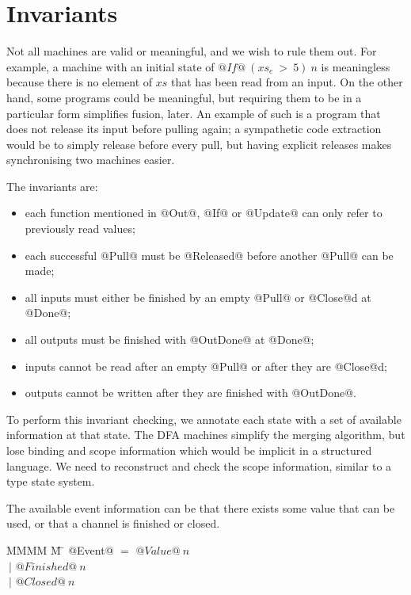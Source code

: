 \section{Invariants}
\label{s:Machines:Invariants}
Not all machines are valid or meaningful, and we wish to rule them out.
For example, a machine with an initial state of $@If@~(xs_e~>~5)~n$ is meaningless because there is no element of $xs$ that has been read from an input. 
On the other hand, some programs could be meaningful, but requiring them to be in a particular form simplifies fusion, later.
An example of such is a program that does not release its input before pulling again; a sympathetic code extraction would be to simply release before every pull, but having explicit releases makes synchronising two machines easier.

The invariants are:
\begin{itemize}
\item each function mentioned in @Out@, @If@ or @Update@ can only refer to previously read values;
\item each successful @Pull@ must be @Released@ before another @Pull@ can be made;
\item all inputs must either be finished by an empty @Pull@ or @Close@d at @Done@;
\item all outputs must be finished with @OutDone@ at @Done@;
\item inputs cannot be read after an empty @Pull@ or after they are @Close@d;
\item outputs cannot be written after they are finished with @OutDone@.
\end{itemize}

To perform this invariant checking, we annotate each state with a set of available information at that state.
The DFA machines simplify the merging algorithm, but lose binding and scope information which would be implicit in a structured language.
We need to reconstruct and check the scope information, similar to a type state system\CITE.

The available event information can be that there exists some value that can be used, or that a channel is finished or closed.

\begin{tabbing}
MMMM \= M \= \kill
@Event@ \> $=$  \> $@Value@~n$ \\
       \> $~|$ \> $@Finished@~n$ \\
       \> $~|$ \> $@Closed@~n$ \\
\end{tabbing}

